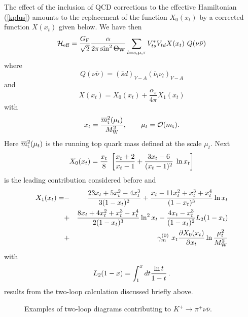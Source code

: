 \documentclass[12pt]{article}
\def\as{\alpha_s}
\newcommand{\mt}{m_{\rm t}}
\newcommand{\mtb}{\overline{m}_{\rm t}}
\newcommand{\mw}{M_{\rm W}}
\newcommand{\be}{\begin{equation}}
\newcommand{\ee}{\end{equation}}
\newcommand{\f}{\frac}
\def\kpnn{$K^+\rightarrow\pi^+\nu\bar\nu$}
\def\aspi{\frac{\as}{4\pi}}
\begin{document}
\begin{itemize}
\begin{itemize}
The effect of the inclusion of QCD corrections
to the effective Hamiltonian  (\ref{kplus}) amounts to 
the replacement of the function $X_0(x_t)$ by a corrected
function $X(x_t)$ given below. We have then
\begin{equation}\label{hkpn0} 
{\cal H}_{\rm eff}={G_{\rm F} \over{\sqrt 2}}{\alpha\over 2\pi 
\sin^2\Theta_{\rm W}}
 \sum_{l=e,\mu,\tau}
V^{\ast}_{ts}V_{td} X(x_t)~Q(\nu\bar\nu)
 \end{equation}
where
\be
Q(\nu\bar\nu)=(\bar sd)_{V-A}(\bar\nu_l\nu_l)_{V-A} 
\ee
and
\begin{equation}\label{xx} 
X(x_t)=X_0(x_t)+\aspi X_1(x_t) 
\end{equation}
with
\be
x_t=\f{\mtb^2(\mu_t)}{\mw^2},
\qquad
\mu_t={\cal O}(\mt).
\ee
Here $\mtb^2(\mu_t)$ is the running top quark mass defined at the
scale $\mu_t$. Next \cite{IL}
\begin{equation}\label{X01}
X_0(x_t)={{x_t}\over{8}}\;\left[{{x_t+2}\over{x_t-1}} 
+ {{3 x_t-6}\over{(x_t -1)^2}}\; \ln x_t\right] 
\end{equation}
is the leading contribution considered before and \cite{BB1,BB2} 
\begin{eqnarray}\label{xx2}
X_1(x_t)=&-&{23x_t+5x_t^2-4x_t^3\over 3(1-x_t)^2}
+{x_t-11x_t^2+x_t^3+x_t^4\over (1-x_t)^3}\ln x_t
\nonumber\\
&+&{8x_t+4x_t^2+x_t^3-x_t^4\over 2(1-x_t)^3}\ln^2 x_t
-{4x_t-x_t^3\over (1-x_t)^2}L_2(1-x_t)
\nonumber\\
&+&\gamma^{(0)}_m~
 x_t{\partial X_0(x_t)\over\partial x_t}\ln \f{\mu_t^2}{\mw^2}
\end{eqnarray}
with
\begin{equation}\label{l2} 
L_2(1-x)=\int^x_1 dt {\ln t\over 1-t}   \,.
\end{equation}
results from the two-loop calculation discussed briefly above.

\begin{figure}[hbt]
\vspace{0.10in}
\centerline{
\epsfysize=3in
}%
\vspace{0.08in}
\caption[]{Examples of two-loop diagrams contributing to \kpnn .
\label{L:7}}
\end{figure}
 

\end{itemize}
\end{itemize}
\end{document}
